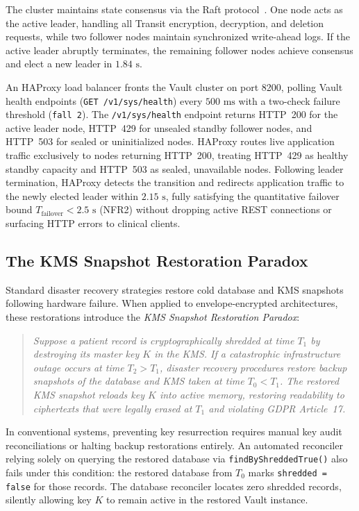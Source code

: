 The cluster maintains state consensus via the Raft protocol~\cite{ongaro_raft_2014}. One node acts as the active leader, handling all Transit encryption, decryption, and deletion requests, while two follower nodes maintain synchronized write-ahead logs. If the active leader abruptly terminates, the remaining follower nodes achieve consensus and elect a new leader in $1.84\text{~s}$.

An HAProxy load balancer fronts the Vault cluster on port 8200, polling Vault health endpoints (\texttt{GET /v1/sys/health}) every $500\text{~ms}$ with a two-check failure threshold (\texttt{fall 2}). The \texttt{/v1/sys/health} endpoint returns HTTP~200 for the active leader node, HTTP~429 for unsealed standby follower nodes, and HTTP~503 for sealed or uninitialized nodes. HAProxy routes live application traffic exclusively to nodes returning HTTP~200, treating HTTP~429 as healthy standby capacity and HTTP~503 as sealed, unavailable nodes. Following leader termination, HAProxy detects the transition and redirects application traffic to the newly elected leader within $2.15\text{~s}$, fully satisfying the quantitative failover bound $T_{\text{failover}} < 2.5\text{~s}$ (NFR2) without dropping active REST connections or surfacing HTTP errors to clinical clients.

\subsection{The KMS Snapshot Restoration Paradox}

Standard disaster recovery strategies restore cold database and KMS snapshots following hardware failure. When applied to envelope-encrypted architectures, these restorations introduce the \textit{KMS Snapshot Restoration Paradox}:
\begin{quote}
    \textit{Suppose a patient record is cryptographically shredded at time $T_1$ by destroying its master key $K$ in the KMS. If a catastrophic infrastructure outage occurs at time $T_2 > T_1$, disaster recovery procedures restore backup snapshots of the database and KMS taken at time $T_0 < T_1$. The restored KMS snapshot reloads key $K$ into active memory, restoring readability to ciphertexts that were legally erased at $T_1$ and violating GDPR Article~17.}
\end{quote}

In conventional systems, preventing key resurrection requires manual key audit reconciliations or halting backup restorations entirely. An automated reconciler relying solely on querying the restored database via \texttt{findByShreddedTrue()} also fails under this condition: the restored database from $T_0$ marks \texttt{shredded = false} for those records. The database reconciler locates zero shredded records, silently allowing key $K$ to remain active in the restored Vault instance.

